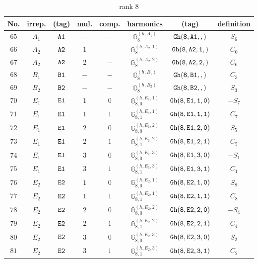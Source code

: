 \documentclass[fleqn,8pt]{jsarticle}
\begin{document}
\begin{table}[ht!]
\begin{center}
\caption{rank 8}
\renewcommand{\arraystretch}{1.3}
\begin{tabular}{cccccccc} \hline \hline
No. & irrep. & (tag) & mul. & comp. & harmonics & (tag) & definition \\ \hline
$ 65 $ & $ A_{1} $ & $ {\tt A1} $ & $ - $ & $ - $ & $ \mathbb{G}_{8}^{(h,A_{1})} $ & $ {\tt Gh(8,A1,,)} $ & $ S_{6} $ \\
$ 66 $ & $ A_{2} $ & $ {\tt A2} $ & $ 1 $ & $ - $ & $ \mathbb{G}_{8}^{(h,A_{2},1)} $ & $ {\tt Gh(8,A2,1,)} $ & $ C_{0} $ \\
$ 67 $ & $ A_{2} $ & $ {\tt A2} $ & $ 2 $ & $ - $ & $ \mathbb{G}_{8}^{(h,A_{2},2)} $ & $ {\tt Gh(8,A2,2,)} $ & $ C_{6} $ \\
$ 68 $ & $ B_{1} $ & $ {\tt B1} $ & $ - $ & $ - $ & $ \mathbb{G}_{8}^{(h,B_{1})} $ & $ {\tt Gh(8,B1,,)} $ & $ C_{3} $ \\
$ 69 $ & $ B_{2} $ & $ {\tt B2} $ & $ - $ & $ - $ & $ \mathbb{G}_{8}^{(h,B_{2})} $ & $ {\tt Gh(8,B2,,)} $ & $ S_{3} $ \\
$ 70 $ & $ E_{1} $ & $ {\tt E1} $ & $ 1 $ & $ 0 $ & $ \mathbb{G}_{8,0}^{(h,E_{1},1)} $ & $ {\tt Gh(8,E1,1,0)} $ & $ - S_{7} $ \\
$ 71 $ & $ E_{1} $ & $ {\tt E1} $ & $ 1 $ & $ 1 $ & $ \mathbb{G}_{8,1}^{(h,E_{1},1)} $ & $ {\tt Gh(8,E1,1,1)} $ & $ C_{7} $ \\
$ 72 $ & $ E_{1} $ & $ {\tt E1} $ & $ 2 $ & $ 0 $ & $ \mathbb{G}_{8,0}^{(h,E_{1},2)} $ & $ {\tt Gh(8,E1,2,0)} $ & $ S_{5} $ \\
$ 73 $ & $ E_{1} $ & $ {\tt E1} $ & $ 2 $ & $ 1 $ & $ \mathbb{G}_{8,1}^{(h,E_{1},2)} $ & $ {\tt Gh(8,E1,2,1)} $ & $ C_{5} $ \\
$ 74 $ & $ E_{1} $ & $ {\tt E1} $ & $ 3 $ & $ 0 $ & $ \mathbb{G}_{8,0}^{(h,E_{1},3)} $ & $ {\tt Gh(8,E1,3,0)} $ & $ - S_{1} $ \\
$ 75 $ & $ E_{1} $ & $ {\tt E1} $ & $ 3 $ & $ 1 $ & $ \mathbb{G}_{8,1}^{(h,E_{1},3)} $ & $ {\tt Gh(8,E1,3,1)} $ & $ C_{1} $ \\
$ 76 $ & $ E_{2} $ & $ {\tt E2} $ & $ 1 $ & $ 0 $ & $ \mathbb{G}_{8,0}^{(h,E_{2},1)} $ & $ {\tt Gh(8,E2,1,0)} $ & $ S_{8} $ \\
$ 77 $ & $ E_{2} $ & $ {\tt E2} $ & $ 1 $ & $ 1 $ & $ \mathbb{G}_{8,1}^{(h,E_{2},1)} $ & $ {\tt Gh(8,E2,1,1)} $ & $ C_{8} $ \\
$ 78 $ & $ E_{2} $ & $ {\tt E2} $ & $ 2 $ & $ 0 $ & $ \mathbb{G}_{8,0}^{(h,E_{2},2)} $ & $ {\tt Gh(8,E2,2,0)} $ & $ - S_{4} $ \\
$ 79 $ & $ E_{2} $ & $ {\tt E2} $ & $ 2 $ & $ 1 $ & $ \mathbb{G}_{8,1}^{(h,E_{2},2)} $ & $ {\tt Gh(8,E2,2,1)} $ & $ C_{4} $ \\
$ 80 $ & $ E_{2} $ & $ {\tt E2} $ & $ 3 $ & $ 0 $ & $ \mathbb{G}_{8,0}^{(h,E_{2},3)} $ & $ {\tt Gh(8,E2,3,0)} $ & $ S_{2} $ \\
$ 81 $ & $ E_{2} $ & $ {\tt E2} $ & $ 3 $ & $ 1 $ & $ \mathbb{G}_{8,1}^{(h,E_{2},3)} $ & $ {\tt Gh(8,E2,3,1)} $ & $ C_{2} $ \\
 \hline \hline
\end{tabular}
\end{center}
\end{table}
\end{document}
